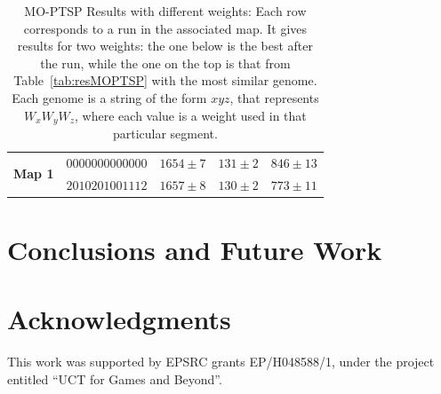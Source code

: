 \documentclass[journal]{IEEEtran}
\begin{document}
\begin{table}[!t]
\begin{center}
\begin{tabular}{|p{0.8cm}|p{2.2cm}|m{1.13cm}|m{1.13cm}|m{1.13cm}|}
\hline
 \multirow{3}{*}{\textbf{Map 1}} & $0000000000000$ & $1654 \pm 7$ & $131 \pm 2$& $846 \pm 13$\\
 & $2010201001112$ & $1657 \pm 8$ & $130 \pm 2$ & $773 \pm 11$\\
\hline
\end{tabular}
\caption{MO-PTSP Results with different weights: Each row corresponds to a run in the associated map. It gives results for two weights: the one below is the best after the run, while the one on the top is that from Table~\ref{tab:resMOPTSP} with the most similar genome. Each genome is a string of the form $xyz$, that represents $W_xW_yW_z$, where each value is a weight used in that particular segment.}
\label{tab:resVarW}
\end{center}
\end{table}

\section{Conclusions and Future Work} \label{sec:conc}




\section*{Acknowledgments}
This work was supported by EPSRC grants EP/H048588/1, under the project entitled ``UCT for Games and Beyond''.


\ifCLASSOPTIONcaptionsoff
  \newpage
\fi





%
%
%
\end{document}
